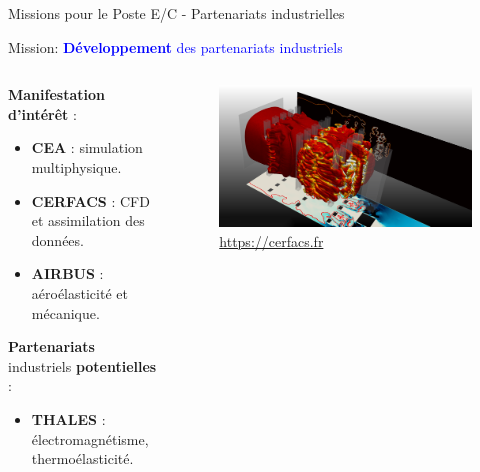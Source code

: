 \documentclass[aspectratio=169, french]{beamer}
\begin{document}
\begin{frame}{Missions pour le Poste E/C - Partenariats industrielles}	

	\begin{tcolorbox}
		Mission: \textcolor{blue}{\textbf{Développement} des partenariats industriels}
	\end{tcolorbox}

	\begin{columns}
		\begin{column}{.5\textwidth}
			\textbf{Manifestation d'intérêt} : 
			\begin{itemize}
				\item \textbf{CEA} : simulation multiphysique.
				\item \textbf{CERFACS} : CFD et assimilation des données. 
				\item \textbf{AIRBUS} : aéroélasticité et mécanique.
			\end{itemize}
		\textbf{Partenariats} industriels \textbf{potentielles} : 
		\begin{itemize}
			\item  \textbf{THALES} : électromagnétisme, thermoélasticité.
		\end{itemize}
		\end{column}
		\begin{column}{.43\textwidth}
			\begin{figure}
				\includegraphics[width=1\textwidth]{image_CERFACS.png}
				\caption{\href{https://cerfacs.fr/logiciels-de-simulation-pour-la-mecanique-des-fluides/}{https://cerfacs.fr}}
			\end{figure}	
		\end{column}
	\end{columns}
	
\end{frame}
\end{document}
